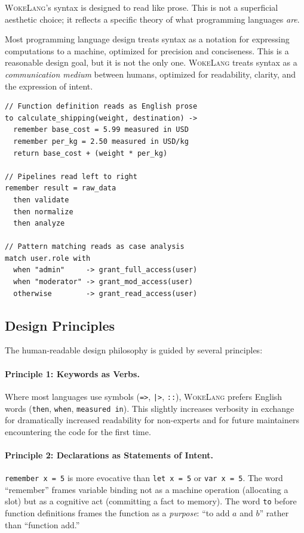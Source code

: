 \documentclass[11pt,a4paper]{article}
\newcommand{\WokeLang}{\textsc{WokeLang}}
\begin{document}
\WokeLang{}'s syntax is designed to read like prose.  This is not a
superficial aesthetic choice; it reflects a specific theory of what
programming languages \emph{are}.

Most programming language design treats syntax as a notation for
expressing computations to a machine, optimized for precision and
conciseness.  This is a reasonable design goal, but it is not the only
one.  \WokeLang{} treats syntax as a \emph{communication medium}
between humans, optimized for readability, clarity, and the expression
of intent.

\begin{lstlisting}[caption={Human-readable syntax examples}]
// Function definition reads as English prose
to calculate_shipping(weight, destination) ->
  remember base_cost = 5.99 measured in USD
  remember per_kg = 2.50 measured in USD/kg
  return base_cost + (weight * per_kg)

// Pipelines read left to right
remember result = raw_data
  then validate
  then normalize
  then analyze

// Pattern matching reads as case analysis
match user.role with
  when "admin"     -> grant_full_access(user)
  when "moderator" -> grant_mod_access(user)
  otherwise        -> grant_read_access(user)
\end{lstlisting}

\subsection{Design Principles}

The human-readable design philosophy is guided by several principles:

\paragraph{Principle 1: Keywords as Verbs.}
Where most languages use symbols (\texttt{=>}, \texttt{|>},
\texttt{::}), \WokeLang{} prefers English words (\texttt{then},
\texttt{when}, \texttt{measured in}).  This slightly increases
verbosity in exchange for dramatically increased readability for
non-experts and for future maintainers encountering the code for the
first time.

\paragraph{Principle 2: Declarations as Statements of Intent.}
\texttt{remember x = 5} is more evocative than \texttt{let x = 5} or
\texttt{var x = 5}.  The word ``remember'' frames variable binding
not as a machine operation (allocating a slot) but as a cognitive act
(committing a fact to memory).  The word \texttt{to} before function
definitions frames the function as a \emph{purpose}: ``to add $a$ and
$b$'' rather than ``function add.''
\end{document}
